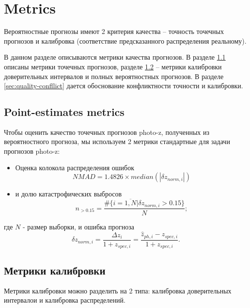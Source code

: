 \documentclass[fleqn,usenatbib]{mnras}
\begin{document}
\section{Metrics}\label{Критерии качества вероятностных прогнозов}

Вероятностные прогнозы имеют 2 критерия качества -- точность точечных прогнозов и калибровка (соответствие предсказанного распределения реальному).

В данном разделе описываются метрики качества прогнозов. В разделе \ref{sec:point-metrics} описаны метрики точечных прогнозов, разделе \ref{sec:calibration-metrics} -- метрики калибровки доверительных интервалов и полных вероятностных прогнозов. В разделе \ref{sec:quality-confllict} дается обоснование конфликтности точности и калибровки.

\subsection{Point-estimates metrics}\label{sec:point-metrics}

Чтобы оценить качество точечных прогнозов photo-z, полученных из вероятностного прогноза, мы используем 2 метрики стандартные для задачи прогнозов photo-z:
\begin{itemize}
    \item Оценка колокола распределения ошибок \begin{equation}\label{eq:nmad}
        NMAD = 1.4826 \times median(|\delta z_{norm,i}|)
    \end{equation}
    \item и долю катастрофических выбросов \begin{equation}\label{eq:n015}
        n_{>0.15} = \frac{\#\{i = \overline{1, N} | \delta z_{norm, i} > 0.15\}}{N};
    \end{equation}
\end{itemize}
где \(N\) - размер выборки, и ошибка прогноза \begin{equation}\label{eq:dznorm}
    \delta z_{norm,i} = \frac{\Delta z_i}{1+z_{spec,i}} = \frac{\hat{z}_{ph,i} - z_{spec,i}}{1+z_{spec,i}}.
\end{equation}

\subsection{Метрики калибровки}\label{sec:calibration-metrics}

Метрики калибровки можно разделить на 2 типа: калибровка доверительных интервалои и калибровка распределений.
\end{document}
